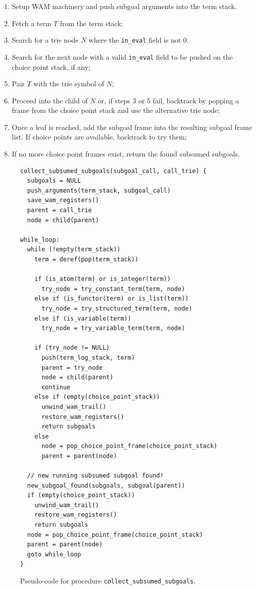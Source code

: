 \begin{enumerate}
  \item Setup WAM machinery and push subgoal arguments into the term stack.
  \item Fetch a term $T$ from the term stack;
  \item Search for a trie node $N$ where the \texttt{in\_eval} field is not 0.
  \item Search for the next node with a valid \texttt{in\_eval} field to be pushed on the choice point stack,
         if any;
  \item Pair $T$ with the trie symbol of $N$;
  \item Proceed into the child of $N$ or, if steps 3 or 5 fail, backtrack by popping a frame from the choice point stack and use the alternative trie node;
  \item Once a leaf is reached, add the subgoal frame into the resulting subgoal frame list.
  If choice points are available, backtrack to try them;
  \item If no more choice point frames exist, return the found subsumed subgoals.
\end{enumerate}

\begin{figure}[ht]
\begin{Verbatim}
collect_subsumed_subgoals(subgoal_call, call_trie) {
  subgoals = NULL
  push_arguments(term_stack, subgoal_call)
  save_wam_registers()
  parent = call_trie
  node = child(parent)
 
while_loop:
  while (!empty(term_stack))
    term = deref(pop(term_stack))
    
    if (is_atom(term) or is_integer(term))
      try_node = try_constant_term(term, node)
    else if (is_functor(term) or is_list(term))
      try_node = try_structured_term(term, node)
    else if (is_variable(term))
      try_node = try_variable_term(term, node)
    
    if (try_node != NULL)
      push(term_log_stack, term)
      parent = try_node
      node = child(parent)
      continue
    else if (empty(choice_point_stack))
      unwind_wam_trail()
      restore_wam_registers()
      return subgoals
    else
      node = pop_choice_point_frame(choice_point_stack)
      parent = parent(node)
  
  // new running subsumed subgoal found!
  new_subgoal_found(subgoals, subgoal(parent))
  if (empty(choice_point_stack))
    unwind_wam_trail()
    restore_wam_registers()
    return subgoals
  node = pop_choice_point_frame(choice_point_stack)
  parent = parent(node)
  goto while_loop
}
\end{Verbatim}
\caption{Pseudo-code for procedure \texttt{collect\_subsumed\_subgoals}.}
\label{fig:collect_subsumed_subgoals}
\end{figure}

